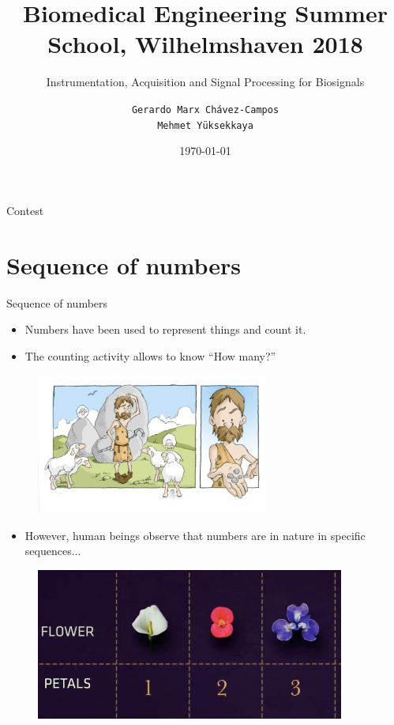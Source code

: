 \documentclass[newPxFont]{beamer}
\title{Biomedical Engineering Summer School, Wilhelmshaven 2018}
\subtitle{ Instrumentation, Acquisition and Signal Processing for Biosignals}
\date{\today}
\author{\texttt{Gerardo Marx Chávez-Campos\\ Mehmet Y\"uksekkaya}}
\institute{\textit{Instituto Tecnológico de Morelia}}
\begin{document}
\maketitle
\begin{frame}{Contest}
\tableofcontents[]
\end{frame}


\section{Sequence of numbers}
\begin{frame}{Sequence of numbers}
\begin{itemize}
  \item Numbers have been used to represent things and count it.
  \item The counting activity allows to know ``How many?''
\end{itemize}

\begin{figure}
  \includegraphics[width=3in]{history_of_numbers_by_buzzios}
\end{figure}
\end{frame}
\begin{frame}
\begin{itemize}
  \item However, human beings observe that numbers are in nature in specific sequences\cite{Nova2017}...
\end{itemize}

\begin{figure}
  \includegraphics[width=4in]{fibonacci1}
\end{figure}
\end{frame}
\end{document}
